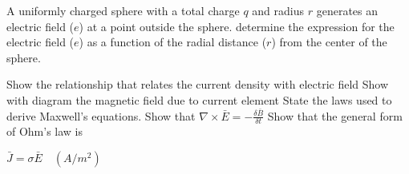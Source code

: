 \begin{mdframed}[backgroundcolor=lightblue, linewidth=1pt, hidealllines=true]
\begin{ExerciseList}
		\Exercise[label={ex4}] A uniformly charged sphere with a total charge \(q\) and radius \(r\) generates an electric field (\(e\)) at a point outside the sphere. determine the expression for the electric field (\(e\)) as a function of the radial distance (\(r\)) from the center of the sphere.
		
		\Exercise[label={ex6}] Show the relationship that relates the current density with electric field
		\Exercise[label={ex7}] Show with diagram the magnetic field due to current element 
		\Exercise[label={ex8}] State the laws used to derive Maxwell's equations.
		\Exercise[label={ex9}] Show that $\nabla \times \bar{E} = -\frac{\delta \bar{B}}{\delta t}$
		\Exercise[label={ex10}] Show that the general form of Ohm's law is 
		
		$\bar{J} = \sigma\bar{E}\quad (A/m^{2})$
		
		
	\end{ExerciseList}
\end{mdframed}